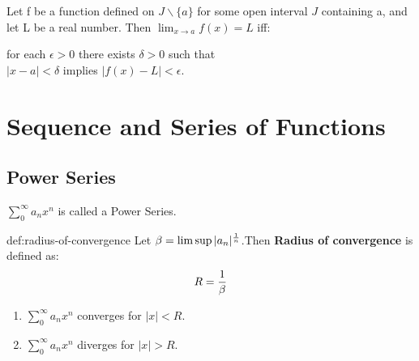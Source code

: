 \documentclass{notes}
\begin{document}
\begin{corollary}{}
	Let f be a function defined on $J \backslash \{a\}$ for some open interval $J$
	containing a, and let L be a real number. Then $\lim_{x \to a} f(x) = L$ iff:
	
	\begin{center}
		for each $\epsilon > 0$ there exists $\delta> 0$ such that \\
		$|x - a| < \delta$ implies $|f(x) - L| < \epsilon$.
	\end{center}
\end{corollary}
\chapter{Sequence and Series of Functions}
\section{Power Series}
\begin{definition}{}
	$\sum_{0}^{\infty} a_n x^n$ is called a Power Series.
\end{definition}
\begin{definition}{def:radius-of-convergence}
	Let $\beta = \limsup |a_n|^{1 \over n}$.Then \textbf{Radius of convergence} is defined as:
	$$ R = {1 \over \beta}$$ 
\end{definition}
\begin{theorem}{}
	\begin{enumerate}
		\item 
		$\sum_{0}^{\infty} a_n x^n$ converges for $|x| < R$.
		\item 
		$\sum_{0}^{\infty} a_n x^n$ diverges for $|x| >R$.
	\end{enumerate}
\end{theorem}
\end{document}
